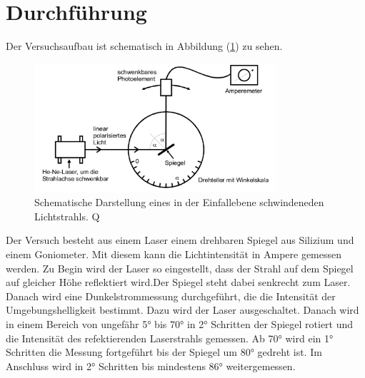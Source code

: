 \section{Durchführung}
\label{sec:Durchführung}
Der Versuchsaufbau ist schematisch in Abbildung (\ref{fig:allgemeiner_Versuchsaufbau}) zu sehen. 
\begin{figure}
    \centering
    \includegraphics[width=0.8\textwidth]{content/Bilder/Versuchsaufbau_allgemein.jpeg}
    \caption{Schematische Darstellung eines in der Einfallebene schwindeneden Lichtstrahls. Q\cite{anleitungV407}}
    \label{fig:allgemeiner_Versuchsaufbau}
\end{figure}
Der Versuch besteht aus einem Laser einem drehbaren Spiegel aus Silizium und einem Goniometer. Mit diesem kann die Lichtintensität in Ampere gemessen werden. 
Zu Begin wird der Laser so eingestellt, dass der Strahl auf dem Spiegel auf gleicher Höhe reflektiert wird.Der Spiegel steht dabei senkrecht zum 
Laser. Danach wird eine Dunkelstrommessung durchgeführt, die 
die Intensität der Umgebungshelligkeit bestimmt. Dazu wird der Laser ausgeschaltet. 
Danach wird in einem Bereich von ungefähr 5° bis 70° in 2° Schritten der Spiegel rotiert und die Intensität des refektierenden Laserstrahls gemessen. Ab 70° wird ein 
1° Schritten die Messung fortgeführt bis der Spiegel um 80° gedreht ist. Im Anschluss wird in 2° Schritten bis mindestens 86° weitergemessen. 